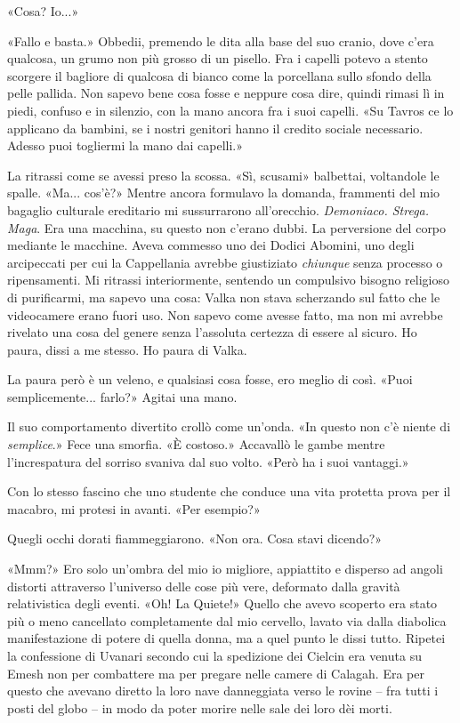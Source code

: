 «Cosa? Io...»

«Fallo e basta.» Obbedii, premendo le dita alla base del suo cranio,
dove c'era qualcosa, un grumo non più grosso di un pisello. Fra i
capelli potevo a stento scorgere il bagliore di qualcosa di bianco come
la porcellana sullo sfondo della pelle pallida. Non sapevo bene cosa
fosse e neppure cosa dire, quindi rimasi lì in piedi, confuso e in
silenzio, con la mano ancora fra i suoi capelli. «Su Tavros ce lo
applicano da bambini, se i nostri genitori hanno il credito sociale
necessario. Adesso puoi togliermi la mano dai capelli.»

La ritrassi come se avessi preso la scossa. «Sì, scusami» balbettai,
voltandole le spalle. «Ma... cos'è?» Mentre ancora formulavo la domanda,
frammenti del mio bagaglio culturale ereditario mi sussurrarono
all'orecchio. \emph{Demoniaco. Strega. Maga}. Era una macchina, su
questo non c'erano dubbi. La perversione del corpo mediante le macchine.
Aveva commesso uno dei Dodici Abomini, uno degli arcipeccati per cui la
Cappellania avrebbe giustiziato \emph{chiunque} senza processo o
ripensamenti. Mi ritrassi interiormente, sentendo un compulsivo bisogno
religioso di purificarmi, ma sapevo una cosa: Valka non stava scherzando
sul fatto che le videocamere erano fuori uso. Non sapevo come avesse
fatto, ma non mi avrebbe rivelato una cosa del genere senza l'assoluta
certezza di essere al sicuro. Ho paura, dissi a me stesso. Ho paura di
Valka.

La paura però è un veleno, e qualsiasi cosa fosse, ero meglio di così.
«Puoi semplicemente... farlo?» Agitai una mano.

Il suo comportamento divertito crollò come un'onda. «In questo non c'è
niente di \emph{semplice}.» Fece una smorfia. «È costoso.» Accavallò le
gambe mentre l'increspatura del sorriso svaniva dal suo volto. «Però ha
i suoi vantaggi.»

Con lo stesso fascino che uno studente che conduce una vita protetta
prova per il macabro, mi protesi in avanti. «Per esempio?»

Quegli occhi dorati fiammeggiarono. «Non ora. Cosa stavi dicendo?»

«Mmm?» Ero solo un'ombra del mio io migliore, appiattito e disperso ad
angoli distorti attraverso l'universo delle cose più vere, deformato
dalla gravità relativistica degli eventi. «Oh! La Quiete!» Quello che
avevo scoperto era stato più o meno cancellato completamente dal mio
cervello, lavato via dalla diabolica manifestazione di potere di quella
donna, ma a quel punto le dissi tutto. Ripetei la confessione di Uvanari
secondo cui la spedizione dei Cielcin era venuta su Emesh non per
combattere ma per pregare nelle camere di Calagah. Era per questo che
avevano diretto la loro nave danneggiata verso le rovine -- fra tutti i
posti del globo -- in modo da poter morire nelle sale dei loro dèi
morti.

